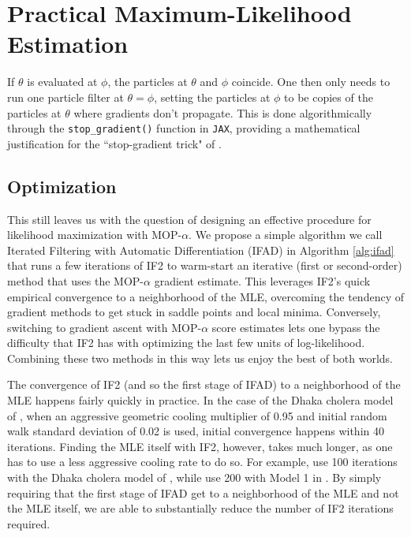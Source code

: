 \documentclass[11pt]{article}
\begin{document}
\section{Practical Maximum-Likelihood Estimation}


If $\theta$ is evaluated at $\phi$, the particles at $\theta$ and $\phi$ coincide. One then only needs to run one particle filter at $\theta=\phi$, setting the particles at $\phi$ to be copies of the particles at $\theta$ where gradients don't propagate. This is done algorithmically through the \texttt{stop\_gradient()} function in \texttt{JAX}, providing a mathematical justification for the ``stop-gradient trick" of \cite{scibior21}.

\subsection{Optimization}

This still leaves us with the question of designing an effective procedure for likelihood maximization with MOP-$\alpha$. We propose a simple algorithm we call Iterated Filtering with Automatic Differentiation (IFAD) in Algorithm \ref{alg:ifad} that runs a few iterations of IF2 to warm-start an iterative (first or second-order) method that uses the MOP-$\alpha$ gradient estimate. This leverages IF2's quick empirical convergence to a neighborhood of the MLE, overcoming the tendency of gradient methods to get stuck in saddle points and local minima. Conversely, switching to gradient ascent with MOP-$\alpha$ score estimates lets one bypass the difficulty that IF2 has with optimizing the last few units of log-likelihood. Combining these two methods in this way lets us enjoy the best of both worlds.

The  convergence of IF2 (and so the first stage of IFAD) to a neighborhood of the MLE happens fairly quickly in practice. In the case of the Dhaka cholera model of \cite{king08}, when an aggressive geometric cooling multiplier of 0.95 and initial random walk standard deviation of 0.02 is used, initial convergence happens within 40 iterations. Finding the MLE itself with IF2, however, takes much longer, as one has to use a less aggressive cooling rate to do so. For example, \cite{ionides15} use 100 iterations with the Dhaka cholera model of \cite{king08}, while \cite{wheeler23} use 200 with Model 1 in \cite{lee20}. By simply requiring that the first stage of IFAD get to a neighborhood of the MLE and not the MLE itself, we are able to substantially reduce the number of IF2 iterations required. 
\end{document}
